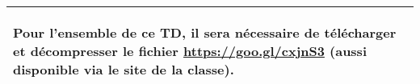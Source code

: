 \documentclass[10pt,fleqn]{article} %
\begin{document}

\vspace{5cm}
\pagestyle{fancy}
\thispagestyle{plain}

\setcounter{secnumdepth}{5}
\def\columnseprulecolor{\color{ocre}}
\setlength{\columnseprule}{0.4pt} 

\begin{center}
\begin{tabular}{|p{\linewidth}|}
\hline
\begin{center}
\textbf{Pour l'ensemble de ce TD, il sera nécessaire de télécharger et décompresser le fichier 
\url{https://goo.gl/cxjnS3} (aussi disponible via le site de la classe).}
\end{center}\\
\hline
\end{tabular}
\end{center}

\ifprof
\else
\begin{multicols}{2}
\fi





\ifprof
\else
\end{multicols}
\fi
\end{document}
